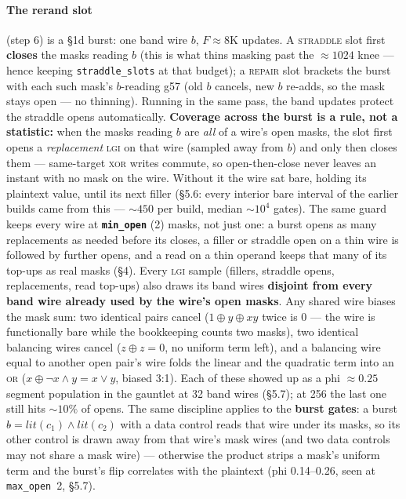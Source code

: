 \documentclass[11pt]{article}
\newcommand{\g}{\textsf{g57}}
\newcommand{\doc}[1]{\texttt{#1}}
\newcommand{\xor}{\oplus}
\newcommand{\lgi}{\textsc{lgi}}
\begin{document}
\paragraph{The rerand slot} (step 6) is a \S1d burst: one band wire $b$,
$F \approx 8\mathrm{K}$ updates. A \textsc{straddle} slot first \textbf{closes} the
masks reading $b$ (this is what thins masking past the $\approx1024$ knee --- hence
keeping \doc{straddle\_slots} at that budget); a \textsc{repair} slot brackets the
burst with each such mask's $b$-reading \g{} (old $b$ cancels, new $b$ re-adds, so
the mask stays open --- no thinning). Running in the same pass, the band updates
protect the straddle opens automatically. \textbf{Coverage across the burst is a
rule, not a statistic:} when the masks reading $b$ are \emph{all} of a wire's open
masks, the slot first opens a \emph{replacement} \lgi{} on that wire (sampled away
from $b$) and only then closes them --- same-target \textsc{xor} writes commute, so
open-then-close never leaves an instant with no mask on the wire. Without it the
wire sat bare, holding its plaintext value, until its next filler (\S5.6: every
interior bare interval of the earlier builds came from this --- ${\sim}450$ per
build, median ${\sim}10^4$ gates). The same guard keeps every wire at
\textbf{\doc{min\_open}} (2) masks, not just one: a burst opens as many replacements as
needed before its closes, a filler or straddle open on a thin wire is followed by further
opens, and a read on a thin operand keeps that many of its top-ups as real masks (\S4). Every \lgi{} sample (fillers, straddle opens,
replacements, read top-ups) also draws its band wires \textbf{disjoint from every
band wire already used by the wire's open masks}. Any shared wire biases the mask
sum: two identical pairs cancel ($1\xor y\xor xy$ twice is 0 --- the wire is
functionally bare while the bookkeeping counts two masks), two identical balancing
wires cancel ($z\xor z=0$, no uniform term left), and a balancing wire equal to
another open pair's wire folds the linear and the quadratic term into an
\textsc{or} ($x \xor \neg x{\wedge}y = x\vee y$, biased 3:1). Each of these showed up
as a phi ${\approx}0.25$ segment population in the gauntlet at 32 band wires
(\S5.7); at 256 the last one still hits ${\sim}10\%$ of opens. The same discipline
applies to the \textbf{burst gates}: a burst $b \mathrel{\hat{}}= \mathit{lit}(c_1)
\wedge \mathit{lit}(c_2)$ with a data control reads that wire under its masks, so
its other control is drawn away from that wire's mask wires (and two data
controls may not share a mask wire) --- otherwise the product strips a mask's
uniform term and the burst's flip correlates with the plaintext (phi 0.14--0.26,
seen at \doc{max\_open}~2, \S5.7).
\end{document}
